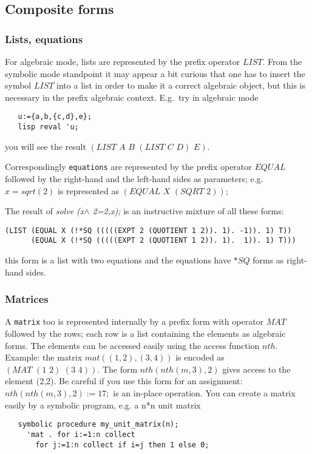 \documentclass[11pt]{article}
\makeatletter
\newcommand{\ttindex}[1]{\index{#1@{\texttt{#1}}}}
\makeatother
\begin{document}
\subsection{Composite forms}

\subsubsection{Lists, equations}

For algebraic mode, lists are represented by the prefix
operator $LIST$. From the symbolic mode standpoint it may 
appear a bit curious that one has to insert
the symbol $LIST$ into a list in order to make it
a correct algebraic object, but this is necessary
in the prefix algebraic context.
E.g.\ try in algebraic mode

\begin{verbatim}
   u:={a,b,{c,d},e};
   lisp reval 'u;
\end{verbatim}
you will see the result $(LIST\,\, A\,\, B\,\, (LIST\,\, C\,\, D)\,\, E)$.

Correspondingly {\tt equations} are represented by
the prefix operator $EQUAL$ followed by the right-hand and
the left-hand sides as parameters; e.g.\  $x=sqrt(2)$
is represented as $(EQUAL\,\, X\,\,(SQRT\,\, 2))$;

The result of {\em solve (x$\wedge$ 2=2,x);} is an instructive
mixture of all these forms:
\begin{verbatim}
(LIST (EQUAL X (!*SQ (((((EXPT 2 (QUOTIENT 1 2)). 1). -1)). 1) T)) 
      (EQUAL X (!*SQ (((((EXPT 2 (QUOTIENT 1 2)). 1).  1)). 1) T)))
\end{verbatim}
this form is a list with two equations and the equations
have $*SQ$ forms as right-hand sides.

\subsubsection{Matrices}

A {\tt matrix}\ttindex{matrix} too is represented internally by
a prefix form with operator $MAT$ followed by the rows;
each row is a list containing the elements as algebraic
forms. The elements can be accessed easily using the
access function $nth$. Example: the matrix $mat((1,2),(3,4))$
is encoded as $(MAT\,\,(1\,\, 2)\,\, (3\,\, 4))$.
The form $nth(nth(m,3),2)$ gives access to the element (2,2).
Be careful if you use this form for an assignment:
$nth(nth(m,3),2):=17;$ is an in-place operation.
You can create a matrix easily by a symbolic program, e.g.
a n*n unit matrix
\begin{verbatim}
   symbolic procedure my_unit_matrix(n);
     'mat . for i:=1:n collect
       for j:=1:n collect if i=j then 1 else 0;
\end{verbatim}
\end{document}
